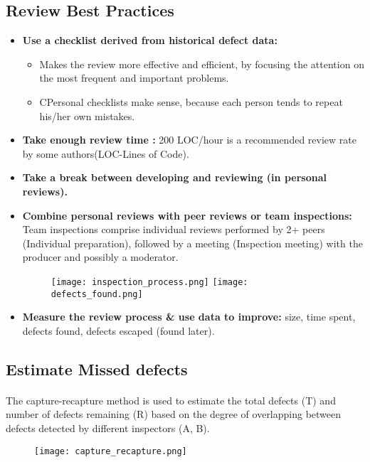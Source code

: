 \documentclass[../ESOF_notes.tex]{subfiles}
\begin{document}
        \subsection{Review Best Practices}
            \begin{itemize}
                \item \textbf{Use a checklist derived from historical defect data:} 
                \begin{itemize}
                    \item Makes the review more effective and efficient, by focusing
                    the attention on the most frequent and important problems. 
                    \item CPersonal checklists make sense, because each person
                    tends to repeat his/her own mistakes.
                    
                \end{itemize}
                \item \textbf{Take enough review time :} 200 LOC/hour 
                is a recommended review rate by some authors(LOC-Lines of Code).
                \item \textbf{Take a break between developing and reviewing
                (in personal reviews).}
                \item \textbf{Combine personal reviews with peer reviews or team
                inspections:} Team inspections comprise individual reviews 
                performed by 2+ peers (Individual preparation), followed 
                by a meeting (Inspection meeting) with the producer and 
                possibly a moderator.
                \begin{figure}[h!]
                    \texttt{[image: inspection\_process.png]}
                    \centering
                    \texttt{[image: defects\_found.png]}
                \end{figure}
\pagebreak
                \item \textbf{Measure the review process \& use data to improve:} 
                size, time spent, defects found, defects escaped (found later).
            \end{itemize}
\pagebreak
        \subsection{Estimate Missed defects}
        \paragraph{}
        The capture-recapture method is used to estimate the total
        defects (T) and number of defects remaining (R) based on
        the degree of overlapping between defects detected by
        different inspectors (A, B).
        \begin{figure}[h!]
            \centering
            \texttt{[image: capture\_recapture.png]}
        \end{figure}
\end{document}
